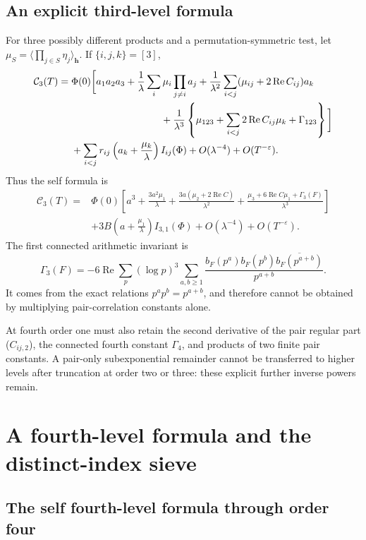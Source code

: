 \documentclass[11pt]{article}
\numberwithin{equation}{section}
\theoremstyle{remark}
\begin{document}
\subsection{An explicit third-level formula}
For three possibly different products and a permutation-symmetric test,
let $\mu_S=\langle\prod_{j\in S}\eta_j\rangle_{\boldsymbol h}$. If $\{i,j,k\}=[3]$,
\begin{align*}
 \mathcal C_3(T)={}&\Phi(0)\bigg[
 a_1a_2a_3+\frac1\lambda\sum_i\mu_i\prod_{j\ne i}a_j
 +\frac1{\lambda^2}\sum_{i<j}(\mu_{ij}+2\operatorname{Re}C_{ij})a_k\\
 &\hspace{32mm}+\frac1{\lambda^3}
 \left\{\mu_{123}+\sum_{i<j}2\operatorname{Re}C_{ij}\mu_k
                   +\Gamma_{123}\right\}\bigg]\\
 &+\sum_{i<j}r_{ij}\left(a_k+\frac{\mu_k}\lambda\right)I_{ij}(\Phi)
 +O(\lambda^{-4})+O(T^{-\varepsilon}).
\end{align*}
Thus the self formula is
\begin{align*}
 \mathcal C_3(T)={}&\Phi(0)\left[
 a^3+\frac{3a^2\mu_1}\lambda
 +\frac{3a(\mu_2+2\operatorname{Re}C)}{\lambda^2}
 +\frac{\mu_3+6\operatorname{Re}C\mu_1+\Gamma_3(F)}{\lambda^3}\right]\\
 &+3B\left(a+\frac{\mu_1}\lambda\right)I_{3,1}(\Phi)
 +O(\lambda^{-4})+O(T^{-\varepsilon}).
\end{align*}
The first connected arithmetic invariant is
\[
 \Gamma_3(F)=-6\operatorname{Re}\sum_p(\log p)^3\sum_{a,b\ge1}
 \frac{b_F(p^a)b_F(p^b)\overline{b_F(p^{a+b})}}{p^{a+b}}.
\]
It comes from the exact relations $p^ap^b=p^{a+b}$, and therefore cannot
be obtained by multiplying pair-correlation constants alone.

At fourth order one must also retain the second derivative of the pair
regular part ($C_{ij,2}$), the connected fourth constant $\Gamma_4$,
and products of two finite pair constants. A pair-only subexponential
remainder cannot be transferred to higher levels after truncation at
order two or three: these explicit further inverse powers remain.


\section{A fourth-level formula and the distinct-index sieve}

\subsection{The self fourth-level formula through order four}
\end{document}
